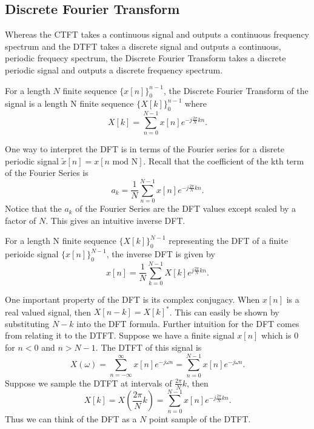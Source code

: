 \subsection{Discrete Fourier Transform}
Whereas the CTFT takes a continuous signal and outputs a continuous frequency spectrum and the DTFT takes a discrete signal
and outputs a continuous, periodic frequecy spectrum, the Discrete Fourier Transform takes a discrete periodic signal and outputs
a discrete frequency spectrum.
\begin{definition}
    For a length $N$ finite sequence $\{x[n]\}^{n-1}_{0}$, the Discrete Fourier Transform of the signal
    is a length N finite sequence $\{X[k]\}^{n-1}_{0}$ where
    \[
	  X[k] = \sum_{n=0}^{N-1}{x[n]e^{-j\frac{2\pi}{N}kn}}.
\]
\end{definition}
One way to interpret the DFT is in terms of the Fourier series for a disrete periodic signal $\tilde{x}[n]=x[n\text{ mod N}]$. Recall that the coefficient of the kth term of the Fourier Series is
\[
  a_k = \frac{1}{N}\sum_{n=0}^{N-1}{x[n]e^{-j\frac{2\pi}{N}kn}}.
\]
Notice that the $a_k$ of the Fourier Series are the DFT values except scaled by a factor of $N$. This gives an intuitive inverse DFT.
\begin{definition}
    For a length N finite sequence $\{X[k]\}^{N-1}_{0}$ representing the DFT of a finite perioidc signal $\{x[n]\}^{N-1}_{0}$,
    the inverse DFT is given by
    \[
	  x[n] = \frac{1}{N}\sum_{k=0}^{N-1}{X[k]e^{j\frac{2\pi}{N}kn}}.
\]
\end{definition}
One important property of the DFT is its complex conjugacy. When $x[n]$ is a real valued signal,
then $X[n-k]=X[k]^*$. This can easily be shown by substituting $N-k$ into the DFT formula. Further intuition for the DFT
comes from relating it to the DTFT. Suppose we have a finite signal $x[n]$ which is $0$ for $n < 0$ and $n > N-1$.
The DTFT of this signal is
\[
  X(\omega) = \sum_{n=-\infty}^{\infty}{x[n]e^{-j\omega n}} = \sum_{n=0}^{N-1}{x[n]e^{-j\omega n}}.
\]
Suppose we sample the DTFT at intervals of $\frac{2\pi}{N}k$, then
\[
  X[k] = X\left(\frac{2\pi}{N}k\right) = \sum_{n=0}^{N-1}{x[n]e^{-j\frac{2\pi}{N}k n}}.
\]
Thus we can think of the DFT as a $N$ point sample of the DTFT.
